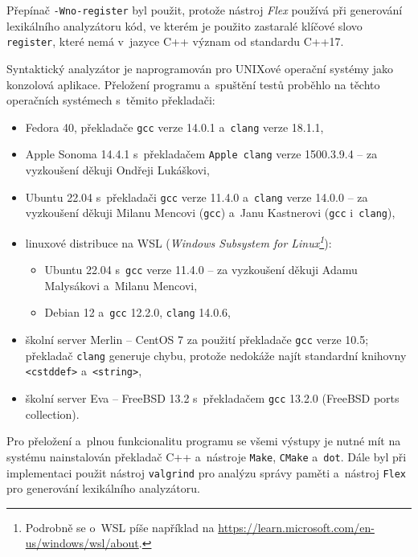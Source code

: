 Přepínač \texttt{-Wno-register} byl použit, protože nástroj \emph{Flex} používá při generování lexikálního analyzátoru kód, ve kterém je použito zastaralé klíčové slovo \texttt{register}, které nemá v~jazyce C++ význam od standardu C++17.

Syntaktický analyzátor je naprogramován pro UNIXové operační systémy jako konzolová aplikace.
Přeložení programu a~spuštění testů proběhlo na těchto operačních systémech s~těmito překladači:
\begin{itemize}
	\item Fedora 40, překladače \texttt{gcc} verze 14.0.1 a~\texttt{clang} verze 18.1.1,
	\item Apple Sonoma 14.4.1 s~překladačem \texttt{Apple clang} verze 1500.3.9.4 -- za vyzkoušení děkuji Ondřeji Lukáškovi,
	\item Ubuntu 22.04 s~překladači \texttt{gcc} verze 11.4.0 a~\texttt{clang} verze 14.0.0 -- za vyzkoušení děkuji Milanu Mencovi (\texttt{gcc}) a~Janu Kastnerovi (\texttt{gcc} i~\texttt{clang}),
	\item linuxové distribuce na WSL (\emph{Windows Subsystem for Linux\footnote{Podrobně se o~WSL píše například na \href{https://learn.microsoft.com/en-us/windows/wsl/about}{https://learn.microsoft.com/en-us/windows/wsl/about}.}}):
	\begin{itemize}[label=$\circ$]
		\item Ubuntu 22.04 s~\texttt{gcc} verze 11.4.0 -- za vyzkoušení děkuji Adamu Malysákovi a~Milanu Mencovi,
		\item Debian 12 a~\texttt{gcc} 12.2.0, \texttt{clang} 14.0.6,
	\end{itemize}
	\item školní server Merlin -- CentOS 7 za použití překladače \texttt{gcc} verze 10.5; překladač \texttt{clang} generuje chybu, protože nedokáže najít standardní knihovny \texttt{<cstddef>} a~\texttt{<string>},
	\item školní server Eva -- FreeBSD 13.2 s~překladačem \texttt{gcc} 13.2.0 (FreeBSD ports collection).
\end{itemize}
Pro přeložení a~plnou funkcionalitu programu se všemi výstupy je nutné mít na systému nainstalován překladač C++ a~nástroje \texttt{Make}, \texttt{CMake} a~\texttt{dot}.
Dále byl při implementaci použit nástroj \texttt{valgrind} pro analýzu správy paměti a~nástroj \texttt{Flex} pro generování lexikálního analyzátoru.

